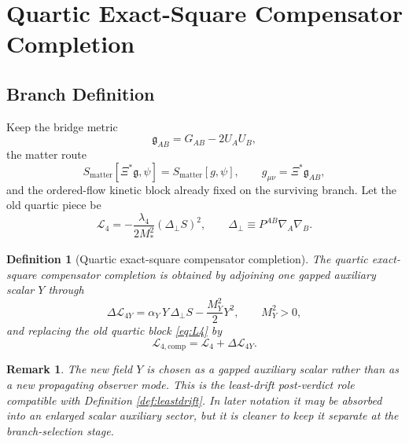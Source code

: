 \documentclass[11pt]{article}
\newcommand{\BridgeMetric}{\mathfrak{g}}
\newtheorem{definition}{Definition}
\newtheorem{remark}{Remark}
\begin{document}
\section{Quartic Exact-Square Compensator Completion}

\subsection{Branch Definition}

Keep the bridge metric
\begin{equation}
\BridgeMetric_{AB}=G_{AB}-2U_AU_B,
\label{eq:bridge}
\end{equation}
the matter route
\begin{equation}
S_{\mathrm{matter}}[\Xi^\ast\BridgeMetric,\psi]
=
S_{\mathrm{matter}}[g,\psi],
\qquad
g_{\mu\nu}=\Xi^\ast\BridgeMetric_{AB},
\label{eq:matter}
\end{equation}
and the ordered-flow kinetic block already fixed on the surviving branch. Let the old quartic piece be
\begin{equation}
\mathcal L_{4}
=
-\frac{\lambda_4}{2M_*^2}(\Delta_\perp S)^2,
\qquad
\Delta_\perp \equiv P^{AB}\nabla_A\nabla_B.
\label{eq:L4}
\end{equation}

\begin{definition}[Quartic exact-square compensator completion]
\label{def:branch}
The \emph{quartic exact-square compensator completion} is obtained by adjoining one gapped auxiliary scalar \(Y\) through
\begin{equation}
\Delta\mathcal L_{4Y}
=
\alpha_Y\,Y\,\Delta_\perp S
-\frac{M_Y^2}{2}Y^2,
\qquad
M_Y^2>0,
\label{eq:L4Y}
\end{equation}
and replacing the old quartic block \eqref{eq:L4} by
\begin{equation}
\mathcal L_{4,\mathrm{comp}}
=
\mathcal L_{4}+\Delta\mathcal L_{4Y}.
\label{eq:L4comp}
\end{equation}
\end{definition}

\begin{remark}
The new field \(Y\) is chosen as a gapped auxiliary scalar rather than as a new propagating observer mode. This is the least-drift post-verdict role compatible with Definition \ref{def:leastdrift}. In later notation it may be absorbed into an enlarged scalar auxiliary sector, but it is cleaner to keep it separate at the branch-selection stage.
\end{remark}
\end{document}
